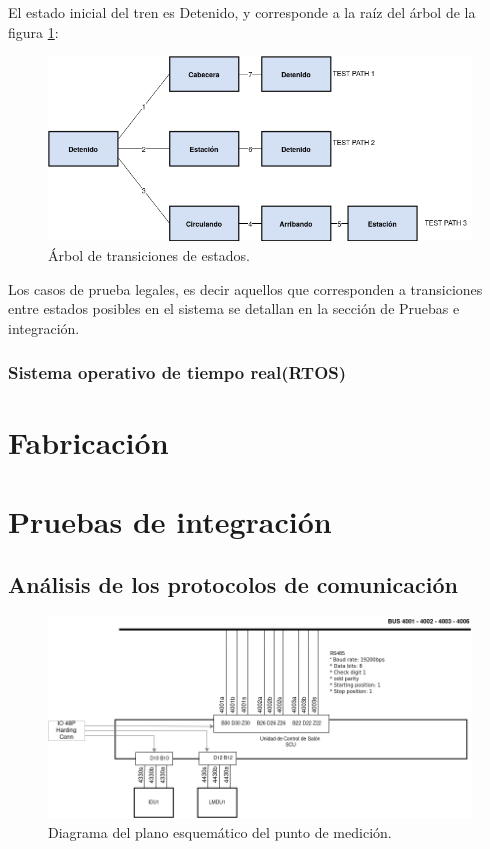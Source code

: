 \documentclass[
11pt, %
]{charter}
\begin{document}
El estado inicial del tren es Detenido, y corresponde a la raíz del árbol de la figura \ref{fig:State tree}:

\begin{figure}[htpb]
\centering 
\includegraphics[width=1\textwidth]{./Pics/STT.Tree.png}
\caption{Árbol de transiciones de estados.}
\label{fig:State tree}
\end{figure}

Los casos de prueba legales, es decir aquellos que corresponden a
transiciones entre estados posibles en el sistema se detallan en la sección de Pruebas e integración.





\pagebreak
\subsubsection{Sistema operativo de tiempo real(RTOS)}

\pagebreak
\section{Fabricación}
\pagebreak
\section{Pruebas de integración}
\subsection{Análisis de los protocolos de comunicación}

\begin{figure}[htpb]
\centering 
\includegraphics[width=1\textwidth]{./Pics/RedPIDS.drawio.png}
\caption{Diagrama del plano esquemático del punto de medición.}
\label{fig:test point SCU-PIDS diagram}
\end{figure}
\end{document}

